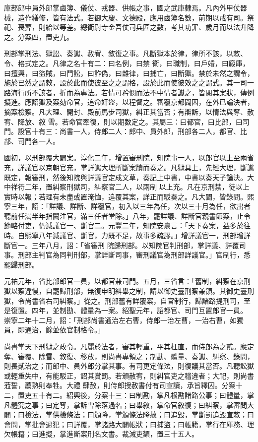 \begin{pinyinscope}
 庫部郎中員外郎掌鹵簿、儀仗、戎器、供帳之事，國之武庫隸焉。凡內外甲仗器械，造作繕修，皆有法式。若御大慶、文德殿，應用鹵簿名數，前期以戒有司。祭祀、喪葬，則給以等差。總衛尉寺金吾仗司兵匠之數，考其功罪、歲月而以法升降之。分案四，置吏九。



 刑部掌刑法、獄訟、奏讞、赦宥、敘復之事。凡斷獄本於律，律所不該，以敕、令、格式定之。凡律之名十有二：曰名例，曰禁
 衛，曰職制，曰戶婚，曰廄庫，曰擅興，曰盜賊，曰鬥訟，曰詐偽，曰雜律，曰捕亡，曰斷獄。禁於未然之謂令，施於已然之謂敕，設於此而使彼至之之謂格，設於此而使彼效之之謂式。其一司一路海行所不該者，折而為專法。若情可矜憫而法不中情者讞之，皆閱其案狀，傳例擬進。應詔獄及案劾命官，追命奸盜，以程督之。審覆京都闢囚，在外已論決者，摘案檢察。凡大理、開封、殿前馬步司獄，糾正其當否；有辯訴，以情法與奪、赦宥、降放、敘
 雪。若命官牽復，則以期數定之。其屬三：曰都官，曰比部，曰司門。設官十有三：尚書一人，侍郎二人：郎中、員外郎，刑部各二人，都官、比部、司門各一人。



 國初，以刑部覆大闢案。淳化二年，增置審刑院，知院事一人，以郎官以上至兩省充，詳議官以京朝官充，掌詳讞大理所斷案牘而奏之。凡獄具上，先經大理，斷讞既定，報審刑，然後知院與詳議官定成文草，奏記上中書，中書以奏天子論決。大中祥符二年，置糾察刑獄司，糾察官二人，以兩制
 以上充。凡在京刑禁，徒以上實時以報；若理有未盡或置淹恤，追覆其案，詳正而駁奏之。凡大闢，皆錄問。熙寧三年，詔：「詳議、詳斷、詳覆官，初入以三年為任，次以三十月為任，欲出者聽前任滿半年指闕注官，滿三任者堂除。」八年，罷詳議、詳斷官親書節案，止令節略付吏，仍減議官一、斷官二。元豐二年，知院安燾言：「天下奏案，益多於往時。自熙寧八年減議官、斷官，力既不足，故事多疏謬。」增詳議官一，刑部增詳斷官一。三年八月，詔：「省審刑
 院歸刑部。以知院官判刑部，掌詳議、詳覆司事。刑部主判官為同判刑部，掌詳斷司事，審刑議官為刑部詳議官。」官制行，悉罷歸刑部。



 元祐元年，省比部郎官一員，以都官兼司門。五月，三省言：「舊制，糾察在京刑獄以察違慢，自罷歸刑部，無復申明糾舉之制，請以御史臺刑察兼領。其御史臺刑獄，令尚書省右司糾察。」從之。刑部舊有詳覆案，自官制行，歸諸路提刑司，至是復置。四年，並制勘、體量為一案。紹聖元年，詔都官、司門互置郎官一員。
 崇寧二年十二月，詔：「刑部尚書通治左右曹，侍郎一治左曹，一治右曹，如獨員，即通治，餘並依官制格令。」



 尚書掌天下刑獄之政令。凡麗於法者，審其輕重，平其枉直，而侍郎為之貳。應定奪、審覆、除雪、敘復、移放，則尚書專領之；制勘、體量、奏讞、糾察、錄問，則長貳治之；而郎中、員外郎分掌其事。有司更定條法，則復議其當否。凡聽訟獄或輕重失中，有能駁正，詔其賞罰。若頒赦宥，則糾官吏之稽違者；大祀，則尚書蒞誓，薦熟則奉牲。大禮
 肆赦，則侍郎授赦書付有司宣讀，承旨釋囚。分案十二，置吏五十有二。紹興後，分案十三：曰制勘，掌凡根勘諸路公事；曰體量，掌凡體究之事；曰定奪，掌訴雪除落過名；曰舉敘，掌命官敘復；曰糾察，掌審問大闢；曰檢法，掌供檢條法；曰頒降，掌頒條法降赦；曰追毀，掌斷罰追毀宣敕；曰會問，掌批會過犯；曰詳覆，掌諸路大闢帳狀；曰捕盜；曰帳籍，掌行在庫務、理欠帳籍；曰進擬，掌進斷案刑名文書。裁減吏額，置三十五人。




\end{pinyinscope}
